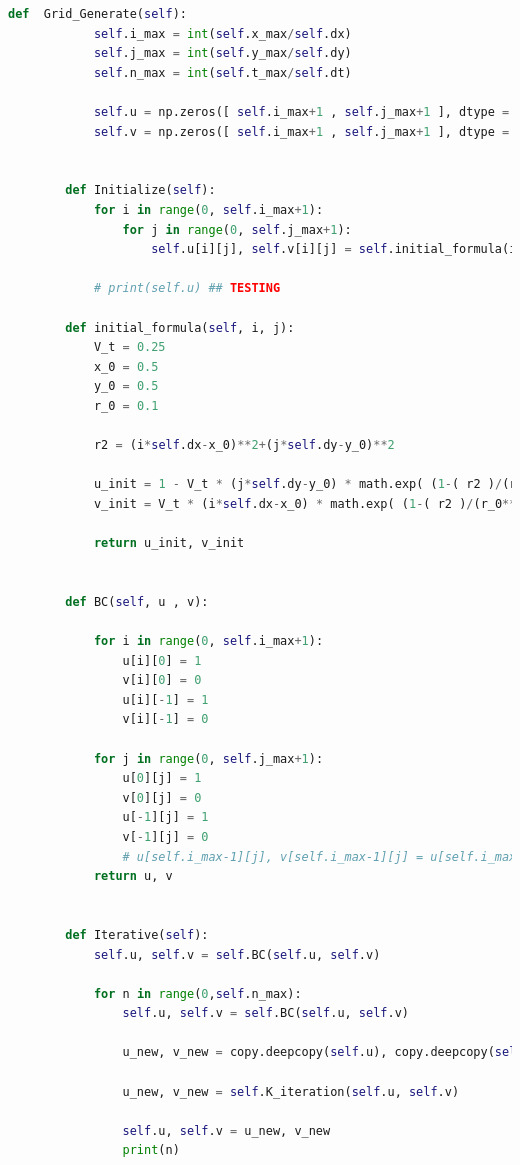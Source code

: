 \documentclass[12pt]{article}
\begin{document}
\begin{scriptsize}
\begin{lstlisting}[language=python,caption={Extended Region using ADI Solver}]
        def  Grid_Generate(self):
            self.i_max = int(self.x_max/self.dx)
            self.j_max = int(self.y_max/self.dy)
            self.n_max = int(self.t_max/self.dt)
    
            self.u = np.zeros([ self.i_max+1 , self.j_max+1 ], dtype = float)
            self.v = np.zeros([ self.i_max+1 , self.j_max+1 ], dtype = float)
    
    
        def Initialize(self):
            for i in range(0, self.i_max+1):
                for j in range(0, self.j_max+1):
                    self.u[i][j], self.v[i][j] = self.initial_formula(i, j)
    
            # print(self.u) ## TESTING 
    
        def initial_formula(self, i, j):
            V_t = 0.25
            x_0 = 0.5
            y_0 = 0.5
            r_0 = 0.1
    
            r2 = (i*self.dx-x_0)**2+(j*self.dy-y_0)**2
    
            u_init = 1 - V_t * (j*self.dy-y_0) * math.exp( (1-( r2 )/(r_0**2)) / (2) )
            v_init = V_t * (i*self.dx-x_0) * math.exp( (1-( r2 )/(r_0**2)) / (2) )
    
            return u_init, v_init
        
    
        def BC(self, u , v):
    
            for i in range(0, self.i_max+1):
                u[i][0] = 1
                v[i][0] = 0
                u[i][-1] = 1
                v[i][-1] = 0
            
            for j in range(0, self.j_max+1):
                u[0][j] = 1
                v[0][j] = 0
                u[-1][j] = 1
                v[-1][j] = 0
                # u[self.i_max-1][j], v[self.i_max-1][j] = u[self.i_max][j], v[self.i_max][j]
            return u, v
        
    
        def Iterative(self):
            self.u, self.v = self.BC(self.u, self.v)
            
            for n in range(0,self.n_max):
                self.u, self.v = self.BC(self.u, self.v)
                
                u_new, v_new = copy.deepcopy(self.u), copy.deepcopy(self.v)
                
                u_new, v_new = self.K_iteration(self.u, self.v)
    
                self.u, self.v = u_new, v_new
                print(n)
            

\end{lstlisting}
\end{scriptsize}
\end{document}
